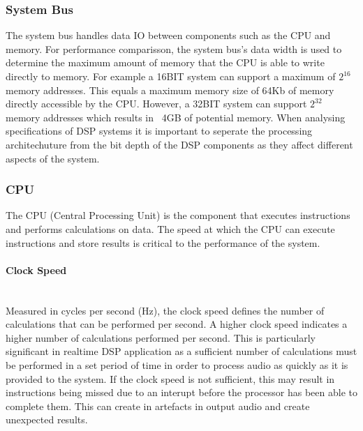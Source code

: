 \documentclass[titlepage]{scrartcl}
\begin{document}
    \subsubsection{System Bus}
    The system bus handles data IO between components such as the CPU
    and memory. For performance comparisson, the system bus's data width is
    used to determine the maximum amount of memory that the CPU is able to
    write directly to memory. 
    For example a 16BIT system can support a maximum of $2^{16}$ memory
    addresses. This equals a maximum memory size of 64Kb of memory directly
    accessible by the CPU. However, a 32BIT system can support $2^{32}$ memory
    addresses which results in ~4GB of potential memory.
    When analysing specifications of DSP systems it is important to seperate
    the processing architechuture from the bit depth of the DSP components as
    they affect different aspects of the system.

    \subsubsection{CPU}\label{CPU}
    The CPU (Central Processing Unit) is the component that executes
    instructions and performs calculations on data. The speed at which the CPU
    can execute instructions and store results is critical to the performance
    of the system.

    \paragraph{Clock Speed}~\\
    Measured in cycles per second (Hz), the clock speed defines the number of
    calculations that can be performed per second. A higher clock speed
    indicates a higher number of calculations performed per second. This is
    particularly significant in realtime DSP application as a sufficient number
    of calculations must be performed in a set period of time in order to
    process audio as quickly as it is provided to the system.  If the clock
    speed is not sufficient, this may result in instructions being missed due
    to an interupt before the processor has been able to complete them. This
    can create in artefacts in output audio and create unexpected results.
\end{document}
